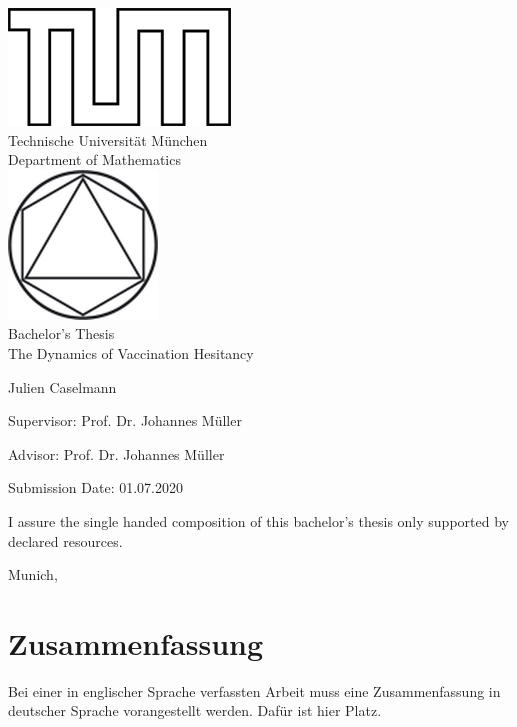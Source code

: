 \documentclass[12pt,a4paper,twoside]{article}
\begin{document}
\pagestyle{empty}
\begin{titlepage}
\begin{center}
\includegraphics{img/TUMlblack.png}\\[3mm]
\sf
{\Large
  Technische Universit\"at M\"unchen\\[5mm]
  Department of Mathematics\\[8mm]
}
\normalsize
\includegraphics{img/TUMlMblack.png}\\[15mm]

Bachelor's Thesis\\[15mm]

{\Huge
  The Dynamics of Vaccination Hesitancy
}
\bigskip

\normalsize

Julien Caselmann
\end{center}
\vspace*{75mm}

Supervisor: Prof. Dr. Johannes M\"uller
\medskip

Advisor: Prof. Dr. Johannes M\"uller
\medskip

Submission Date: 01.07.2020

\end{titlepage}

\vspace*{150mm}

I assure the single handed composition of this bachelor's thesis only supported by declared resources.
\bigskip

Munich,
\newpage
\section*{Zusammenfassung}
Bei einer in englischer Sprache verfassten Arbeit muss eine Zusammenfassung in deutscher Sprache vorangestellt werden.
Daf\"ur ist hier Platz.
\end{document}
